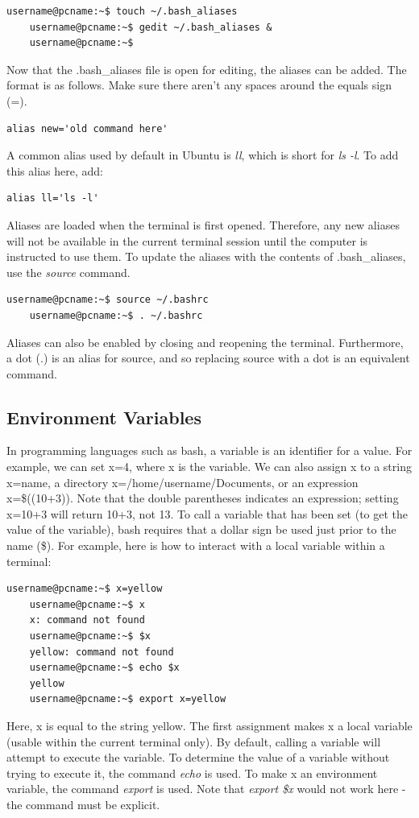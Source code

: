 \documentclass[12pt]{article}
\begin{document}
\begin{lstlisting}[numbers=none]
	username@pcname:~$ touch ~/.bash_aliases
	username@pcname:~$ gedit ~/.bash_aliases &
	username@pcname:~$
\end{lstlisting}
\quad\enskip\quad Now that the .bash\_aliases file is open for editing, the aliases can be added. The format is as follows. Make sure there aren't any spaces around the equals sign (=).
\begin{lstlisting}[numbers=none]
	alias new='old command here'
\end{lstlisting}
A common alias used by default in Ubuntu is \textit{ll}, which is short for \textit{ls -l}. To add this alias here, add:
\begin{lstlisting}[numbers=none]
	alias ll='ls -l'
\end{lstlisting}
\quad\enskip\quad Aliases are loaded when the terminal is first opened. Therefore, any new aliases will not be available in the current terminal session until the computer is instructed to use them. To update the aliases with the contents of .bash\_aliases, use the \textit{source} command.
\begin{lstlisting}[numbers=none]
	username@pcname:~$ source ~/.bashrc
	username@pcname:~$ . ~/.bashrc
\end{lstlisting}
Aliases can also be enabled by closing and reopening the terminal. Furthermore, a dot (.) is an alias for source, and so replacing source with a dot is an equivalent command.

\subsection{Environment Variables}

\quad\enskip\quad In programming languages such as bash, a variable is an identifier for a value. For example, we can set x=4, where x is the variable. We can also assign x to a string x=name, a directory x=/home/username/Documents, or an expression 
x=\$((10+3)). Note that the double parentheses indicates an expression; setting x=10+3 will return 10+3, not 13. To call a variable that has been set (to get the value of the variable), bash requires that a dollar sign be used just prior to the name (\$). For example, here is how to interact with a local variable within a terminal:

\begin{lstlisting}[numbers=none]
	username@pcname:~$ x=yellow
	username@pcname:~$ x
	x: command not found
	username@pcname:~$ $x
	yellow: command not found
	username@pcname:~$ echo $x
	yellow
	username@pcname:~$ export x=yellow
\end{lstlisting}
\quad\enskip\quad Here, x is equal to the string yellow. The first assignment makes x a local variable (usable within the current terminal only). By default, calling a variable will attempt to execute the variable. To determine the value of a variable without trying to execute it, the command \textit{echo} is used. To make x an environment variable, the command \textit{export} is used. Note that \textit{export \$x} would not work here - the command must be explicit.
\end{document}
